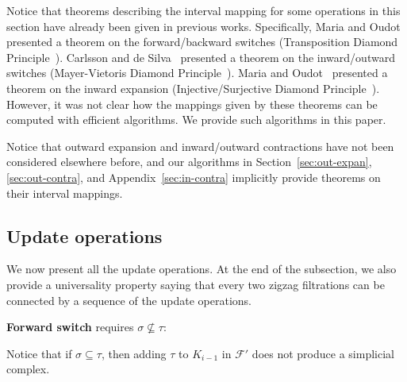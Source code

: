 \documentclass[letterpaper,11pt]{article}
\theoremstyle{mythmstyle}
\theoremstyle{mydefstyle}
\theoremstyle{plain}
\theoremstyle{definition}
\newcommand{\<}[1]{\langle #1\rangle}
\newcommand{\lbarrowspace}{\;}
\newcommand{\inctosp}[1]{\xhookrightarrow{\lbarrowspace#1\lbarrowspace}}
\newcommand{\Fcal}{\mathcal{F}}
\newcommand{\sG}{\sigma}
\newcommand{\tG}{\tau}
\newcommand{\filtcnt}{m}
\begin{document}
Notice that theorems describing the interval mapping for some operations
in this section have already been given in previous works.
Specifically,
Maria and Oudot~\cite{maria2014zigzag,maria2016computing} presented
a theorem on the forward/backward switches
(Transposition Diamond Principle~\cite{maria2014zigzag}).
Carlsson and de Silva~\cite{carlsson2010zigzag} presented
a theorem on the inward/outward switches
(Mayer-Vietoris Diamond Principle~\cite{carlsson2010zigzag,carlsson2019parametrized,carlsson2009zigzag-realvalue}).
Maria and Oudot~\cite{maria2014zigzag,maria2016computing} presented
a theorem on the inward expansion
(Injective/Surjective Diamond Principle~\cite{maria2014zigzag}). However, it was not
clear how the mappings given by these theorems can be computed with
efficient algorithms. We provide such algorithms in this paper.


Notice that outward expansion and inward/outward contractions
have not been considered elsewhere before, and our algorithms 
in Section~\ref{sec:out-expan}, \ref{sec:out-contra}, and Appendix~\ref{sec:in-contra}
implicitly provide theorems on their interval mappings.


\subsection{Update operations}
\label{sec:update-oper}

We now present all the update operations.
At the end of the subsection, we also provide a universality property
saying that every two zigzag filtrations
can be connected by a sequence of the update operations.

\medskip
\noindent
\textbf{{Forward switch}}
requires $\sG\nsubseteq\tG$:

\vspace{-1em}
\begin{center}
\end{center}

\vspace{-1em}\noindent
Notice that if $\sG\subseteq\tG$, then adding $\tG$ to $K_{i-1}$ in $\Fcal'$
does not produce a simplicial complex.
\end{document}
